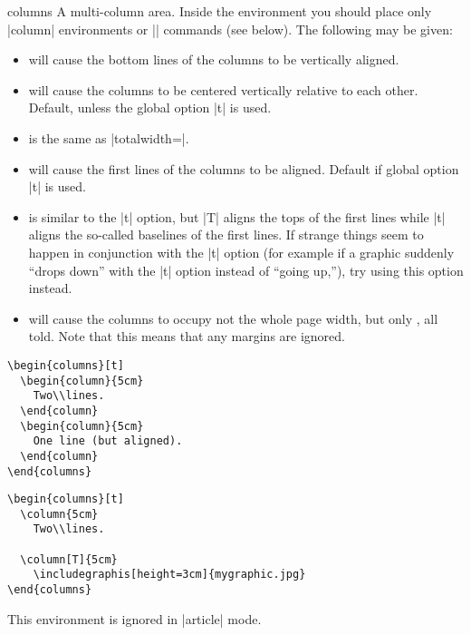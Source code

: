 \begin{environment}{{columns}}
  A multi-column area. Inside the environment you should place only |column| environments or |\column| commands (see below). The following  may be given:
  \begin{itemize}
  \item
     will cause the bottom lines of the columns to be vertically aligned.
  \item
     will cause the columns to be centered vertically relative to each other. Default, unless the global option |t| is used.
  \item
     is the same as |totalwidth=\textwidth|.
  \item
     will cause the first lines of the columns to be aligned. Default if global option |t| is used.
  \item
     is similar to the |t| option, but |T| aligns the tops of the first lines while |t| aligns the so-called baselines of the first lines. If strange things seem to happen in conjunction with the |t| option (for example if a graphic suddenly ``drops down'' with the |t| option instead of ``going up,''), try using this option instead.
  \item
     will cause the columns to occupy not the whole page width, but only , all told.
     Note that this means that any margins are ignored.
  \end{itemize}

  \example
\begin{verbatim}
\begin{columns}[t]
  \begin{column}{5cm}
    Two\\lines.
  \end{column}
  \begin{column}{5cm}
    One line (but aligned).
  \end{column}
\end{columns}
\end{verbatim}

  \example
\begin{verbatim}
\begin{columns}[t]
  \column{5cm}
    Two\\lines.

  \column[T]{5cm}
    \includegraphis[height=3cm]{mygraphic.jpg}
\end{columns}
\end{verbatim}

  \articlenote
  This environment is ignored in |article| mode.

\end{environment}

